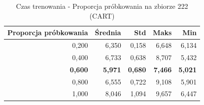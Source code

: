 \begin{table}[htbp]
\centering
\small
\setlength{\tabcolsep}{6pt}
\renewcommand{\arraystretch}{1.2}
\caption{Czas trenowania - Proporcja próbkowania na zbiorze 222 (CART)}
\label{tab:CART_sample_ratio_222_time}
\begin{tabular}{r|r|r|r|r}
\toprule
Proporcja próbkowania & Średnia & Std & Maks & Min \\
\hline
0,200 & 6,350 & 0,158 & 6,648 & 6,134 \\
0,400 & 6,733 & 0,638 & 8,707 & 5,432 \\
\textbf{0,600} & \textbf{5,971} & \textbf{0,680} & \textbf{7,466} & \textbf{5,021} \\
0,800 & 6,555 & 0,722 & 9,108 & 5,901 \\
1,000 & 8,046 & 1,094 & 9,657 & 6,447 \\
\bottomrule
\end{tabular}
\end{table}